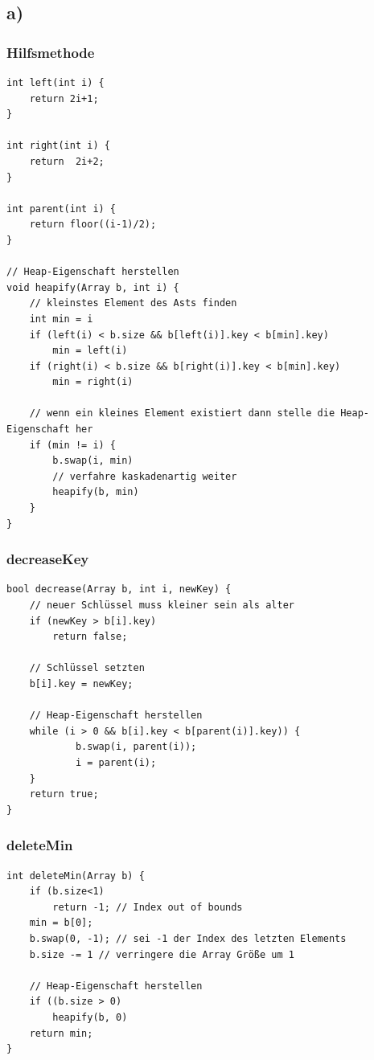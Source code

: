\documentclass[a4paper,11pt,twoside]{scrartcl}
\begin{document}
\subsection*{a)}

\subsubsection*{Hilfsmethode}
\begin{lstlisting}[style=c,basicstyle=\small\ttfamily]
int left(int i) {
	return 2i+1;
}

int right(int i) {
	return  2i+2;
}

int parent(int i) {
	return floor((i-1)/2);
}

// Heap-Eigenschaft herstellen
void heapify(Array b, int i) {
	// kleinstes Element des Asts finden 
	int min = i
	if (left(i) < b.size && b[left(i)].key < b[min].key)
		min = left(i)
	if (right(i) < b.size && b[right(i)].key < b[min].key)
		min = right(i)
		
	// wenn ein kleines Element existiert dann stelle die Heap-Eigenschaft her
	if (min != i) {
		b.swap(i, min)
		// verfahre kaskadenartig weiter
		heapify(b, min)
	}
}

\end{lstlisting}

\subsubsection*{decreaseKey}
\begin{lstlisting}[style=c,basicstyle=\small\ttfamily]
bool decrease(Array b, int i, newKey) {
	// neuer Schlüssel muss kleiner sein als alter
	if (newKey > b[i].key)
		return false;
	
	// Schlüssel setzten
 	b[i].key = newKey;
	
	// Heap-Eigenschaft herstellen
	while (i > 0 && b[i].key < b[parent(i)].key)) {
    		b.swap(i, parent(i));
    		i = parent(i);
	}
	return true;
}
\end{lstlisting}


\pagebreak


\subsubsection*{deleteMin}
\begin{lstlisting}[style=c,basicstyle=\small\ttfamily]
int deleteMin(Array b) {
	if (b.size<1)
		return -1; // Index out of bounds
	min = b[0];
	b.swap(0, -1); // sei -1 der Index des letzten Elements
	b.size -= 1 // verringere die Array Größe um 1

	// Heap-Eigenschaft herstellen
	if ((b.size > 0)
		heapify(b, 0)
	return min;	
}
\end{lstlisting}
\end{document}
